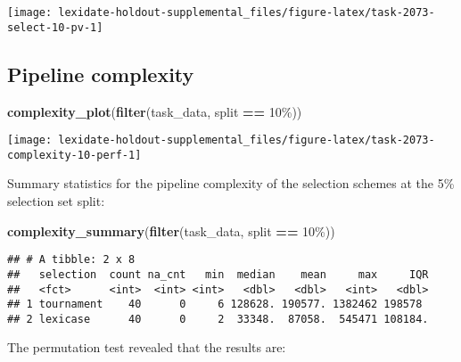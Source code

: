 \documentclass[
]{book}
\newenvironment{Shaded}{\begin{snugshade}}{\end{snugshade}}
\newcommand{\FunctionTok}[1]{\textcolor[rgb]{0.13,0.29,0.53}{\textbf{#1}}}
\newcommand{\NormalTok}[1]{#1}
\newcommand{\SpecialCharTok}[1]{\textcolor[rgb]{0.81,0.36,0.00}{\textbf{#1}}}
\newcommand{\StringTok}[1]{\textcolor[rgb]{0.31,0.60,0.02}{#1}}
\begin{document}
\texttt{[image: lexidate-holdout-supplemental\_files/figure-latex/task-2073-select-10-pv-1]}

\hypertarget{pipeline-complexity-39}{%
\subsection{Pipeline complexity}\label{pipeline-complexity-39}}

\begin{Shaded}
\begin{Highlighting}[]
\FunctionTok{complexity\_plot}\NormalTok{(}\FunctionTok{filter}\NormalTok{(task\_data, split }\SpecialCharTok{==} \StringTok{\textquotesingle{}10\%\textquotesingle{}}\NormalTok{))}
\end{Highlighting}
\end{Shaded}

\texttt{[image: lexidate-holdout-supplemental\_files/figure-latex/task-2073-complexity-10-perf-1]}

Summary statistics for the pipeline complexity of the selection schemes at the 5\% selection set split:

\begin{Shaded}
\begin{Highlighting}[]
\FunctionTok{complexity\_summary}\NormalTok{(}\FunctionTok{filter}\NormalTok{(task\_data, split }\SpecialCharTok{==} \StringTok{\textquotesingle{}10\%\textquotesingle{}}\NormalTok{))}
\end{Highlighting}
\end{Shaded}

\begin{verbatim}
## # A tibble: 2 x 8
##   selection  count na_cnt   min  median    mean     max     IQR
##   <fct>      <int>  <int> <int>   <dbl>   <dbl>   <int>   <dbl>
## 1 tournament    40      0     6 128628. 190577. 1382462 198578 
## 2 lexicase      40      0     2  33348.  87058.  545471 108184.
\end{verbatim}

The permutation test revealed that the results are:
\end{document}
